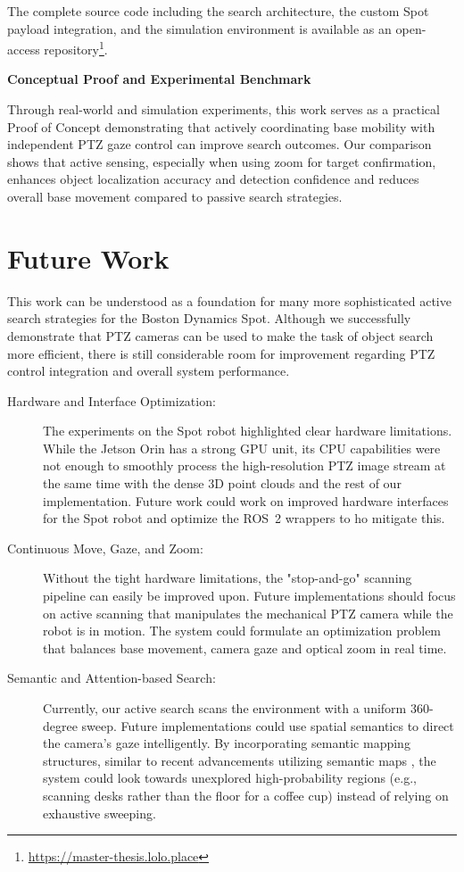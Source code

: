 \documentclass[
	parspace, %
	noindent, %
	final, %
]{elteikthesis}
\begin{document}
The complete source code including the search architecture, the custom Spot payload integration, and the simulation environment is available as an open-access repository\footnote{\url{https://master-thesis.lolo.place}}.
    
\textbf{Conceptual Proof and Experimental Benchmark}

Through real-world and simulation experiments, this work serves as a practical Proof of Concept demonstrating that actively coordinating base mobility with independent PTZ gaze control can improve search outcomes. Our comparison shows that active sensing, especially when using zoom for target confirmation, enhances object localization accuracy and detection confidence and reduces overall base movement compared to passive search strategies.

\section{Future Work}
This work can be understood as a foundation for many more sophisticated active search strategies for the Boston Dynamics Spot. Although we successfully demonstrate that PTZ cameras can be used to make the task of object search more efficient, there is still considerable room for improvement regarding PTZ control integration and overall system performance.

\begin{description}
    \item[Hardware and Interface Optimization:] The experiments on the Spot robot highlighted clear hardware limitations. While the Jetson Orin has a strong GPU unit, its CPU capabilities were not enough to smoothly process the high-resolution PTZ image stream at the same time with the dense 3D point clouds and the rest of our implementation. Future work could work on improved hardware interfaces for the Spot robot and optimize the ROS~2 wrappers to ho mitigate this.
    
    \item[Continuous Move, Gaze, and Zoom:] Without the tight hardware limitations, the "stop-and-go" scanning pipeline can easily be improved upon. Future implementations should focus on active scanning that manipulates the mechanical PTZ camera while the robot is in motion. The system could formulate an optimization problem that balances base movement, camera gaze and optical zoom in real time.
    
    \item[Semantic and Attention-based Search:] Currently, our active search scans the environment with a uniform 360-degree sweep. Future implementations could use spatial semantics to direct the camera's gaze intelligently. By incorporating semantic mapping structures, similar to recent advancements utilizing semantic maps \cite{semantic_asgharivaskasi_2023, active_zhang_2024}, the system could look towards unexplored high-probability regions (e.g., scanning desks rather than the floor for a coffee cup) instead of relying on exhaustive sweeping.

\end{description}
\end{document}

